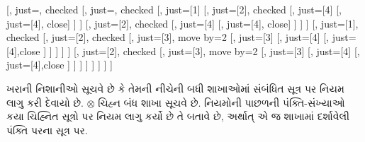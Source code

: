 \begin{maxwidth}
  \begin{tableau}{}
  [,
    just=\TAss, checked
    [, just=\TAss, checked
      [, just={\TRule{\True}{\lor}[1]}
        [,
          just={\TRule{\False}{\land}[2]}, checked
          [,
            just={\TRule{\False}{\lor}[4]}
            [,
              just={\TRule{\False}{\lor}[4]}, close]
          ]
        ]
        [,
          just={\TRule{\False}{\land}[2]}, checked
          [,
            just={\TRule{\False}{\lor}[4]}
            [,
              just={\TRule{\False}{\lor}[4]}, close]
          ]
        ]
      ]
      [,
        just={\TRule{\True}{\lor}[1]}, checked
        [,
          just={\TRule{\False}{\land}[2]}, checked
          [,
            just={\TRule{\True}{\land}[3]}, move by=2
            [,
              just={\TRule{\True}{\land}[3]}
              [,
                just={\TRule{\False}{\lor}[4]}
                [,
                  just={\TRule{\False}{\lor}[4]},close
                ]
              ]
            ]
          ]
        ]
        [,
          just={\TRule{\False}{\land}[2]}, checked
          [,
            just={\TRule{\True}{\land}[3]}, move by=2
              [,
                just={\TRule{\True}{\land}[3]}
                [,
                  just={\TRule{\False}{\lor}[4]}
                  [,
                  just={\TRule{\False}{\lor}[4]},close
                ]
              ]
            ]
          ]
        ]
      ]
    ]
  ]
  \end{tableau}
\end{maxwidth}

ખરાની નિશાનીઓ સૂચવે છે કે તેમની નીચેની બધી
શાખાઓમાં સંબંધિત સૂત્ર પર નિયમ લાગુ
કરી દેવાયો છે. $\otimes$ ચિહ્ન બંધ શાખા સૂચવે છે.
નિયમોની પાછળની પંક્તિ-સંખ્યાઓ કયા ચિહ્નિત
સૂત્રો પર નિયમ લાગુ કર્યો છે તે બતાવે છે,
અર્થાત્ એ જ શાખામાં દર્શાવેલી પંક્તિ પરના
સૂત્ર પર.

